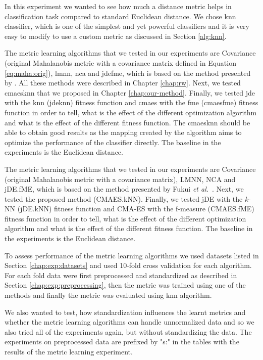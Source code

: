\documentclass[12pt,a4paper]{report}
\begin{document}
In this experiment we wanted to see how much a distance metric helps in classification task compared to standard Euclidean distance. We chose \ac{knn} classifier, which is one of the simplest and yet powerful classifiers and it is very easy to modify to use a custom metric as discussed in Section \ref{alg:knn}.

The metric learning algorithms that we tested in our experiments are Covariance (original Mahalanobis metric with a covariance matrix defined in Equation \ref{eq:maha:orig}), \ac{lmnn}, \ac{nca} and \ac{jdefme}, which is based on the method presented by \cite{fukui2013evolutionary}. All these methods were described in Chapter \ref{chap:rw}. Next, we tested \ac{cmaesknn} that we proposed in Chapter \ref{chap:our-method}. Finally, we tested \ac{jde} with the \ac{knn} (\ac{jdeknn}) fitness function and \ac{cmaes} with the \acl{fme} (\ac{cmaesfme}) fitness function in order to tell, what is the effect of the different optimization algorithm and what is the effect of the different fitness function. The \ac{cmaesknn} should be able to obtain good results as the mapping created by the algorithm aims to optimize the performance of the classifier directly. The baseline in the experiments is the Euclidean distance.

The metric learning algorithms that we tested in our experiments are Covariance (original Mahalanobis metric with a covariance matrix), LMNN, NCA and jDE.fME, which is based on the method presented by Fukui \emph{et al.}~\cite{fukui2013evolutionary}. Next, we tested the proposed method (CMAES.kNN). Finally, we tested jDE with the $k$-NN (jDE.kNN) fitness function and CMA-ES with the f-measure (CMAES.fME) fitness function in order to tell, what is the effect of the different optimization algorithm and what is the effect of the different fitness function. The baseline in the experiments is the Euclidean distance.

To assess performance of the metric learning algorithms we used datasets listed in Section \ref{chap:exp:datasets} and used 10-fold cross validation for each algorithm. For each fold data were first preprocessed and standardized as described in Section \ref{chap:exp:preprocessing}, then the metric was trained using one of the methods and finally the metric was evaluated using \ac{knn} algorithm.

We also wanted to test, how standardization influences the learnt metrics and whether the metric learning algorithms can handle unnormalized data and so we also tried all of the experiments again, but without standardizing the data. The experiments on preprocessed data are prefixed by "s:" in the tables with the results of the metric learning experiment.
\end{document}
